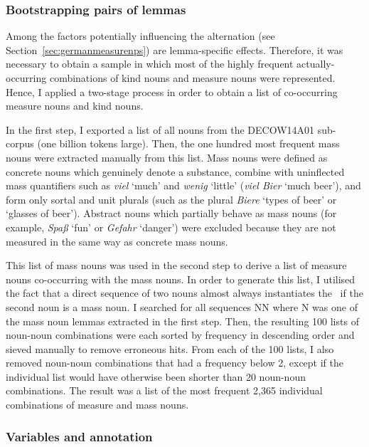 \subsubsection{Bootstrapping pairs of lemmas}
\label{sec:bootstrappinlemmapairs}

Among the factors potentially influencing the alternation (see Section~\ref{sec:germanmeasurenps}) are lemma-specific effects.
Therefore, it was necessary to obtain a sample in which most of the highly frequent actually-occurring combinations of kind nouns and measure nouns were represented.
Hence, I applied a two-stage process in order to obtain a list of co-occurring measure nouns and kind nouns.

In the first step, I exported a list of all nouns from the DECOW14A01 sub-corpus (one billion tokens large).
Then, the one hundred most frequent mass nouns were extracted manually from this list.
Mass nouns were defined as concrete nouns which genuinely denote a substance, combine with uninflected mass quantifiers such as \textit{viel} `much' and \textit{wenig} `little' (\textit{viel Bier} `much beer'), and form only sortal and unit plurals (such as the plural \textit{Biere} `types of beer' or `glasses of beer').
Abstract nouns which partially behave as mass nouns (for example, \textit{Spaß} `fun’ or \textit{Gefahr} `danger’) were excluded because they are not measured in the same way as concrete mass nouns.

This list of mass nouns was used in the second step to derive a list of measure nouns co-occurring with the mass nouns. 
In order to generate this list, I utilised the fact that a direct sequence of two nouns almost always instantiates the \NACb\ if the second noun is a mass noun.
I searched for all sequences NN where N was one of the mass noun lemmas extracted in the first step.
Then, the resulting 100 lists of noun-noun combinations were each sorted by frequency in descending order and sieved manually to remove erroneous hits.
From each of the 100 lists, I also removed noun-noun combinations that had a frequency below 2, except if the individual list would have otherwise been shorter than 20 noun-noun combinations.
The result was a list of the most frequent 2,365 individual combinations of measure and mass nouns.

\subsubsection{Variables and annotation}
\label{sec:variablesandannotation}

